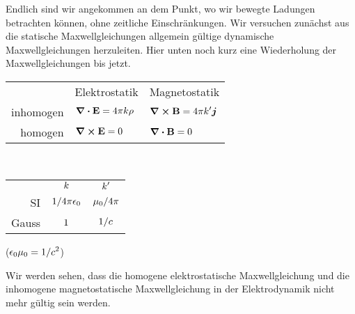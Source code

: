 Endlich sind wir angekommen an dem Punkt, wo wir bewegte Ladungen betrachten
können, ohne zeitliche Einschränkungen. Wir versuchen zunächst aus die
statische Maxwellgleichungen allgemein gültige dynamische Maxwellgleichungen
herzuleiten. Hier unten noch kurz eine Wiederholung der Maxwellgleichungen bis jetzt.
\begin{center}
\begin{tabular}{rll}
  &Elektrostatik&Magnetostatik\\
  inhomogen &$\displaystyle \div \vb E=4\pi k\rho$
            &$\displaystyle \curl \vb B=4\pi k'\vb*j$\\
  homogen   &$\displaystyle \curl \vb E=0$
            &$\displaystyle \div \vb B=0$\\
\end{tabular}\\
\vspace{.2cm}
\begin{tabular}{rcc}
  & $\displaystyle k$ & $\displaystyle k'$\\
  SI    & $\displaystyle1/4\pi\epsilon_0$ & $\displaystyle\mu_0/4\pi$\\
  Gauss & $\displaystyle1$ & $\displaystyle1/c$
\end{tabular}
($\displaystyle \epsilon_0\mu_0 = 1/c^2$)
\end{center}
Wir werden sehen, dass die homogene elektrostatische Maxwellgleichung und
die inhomogene magnetostatische Maxwellgleichung in der Elektrodynamik nicht
mehr gültig sein werden.

